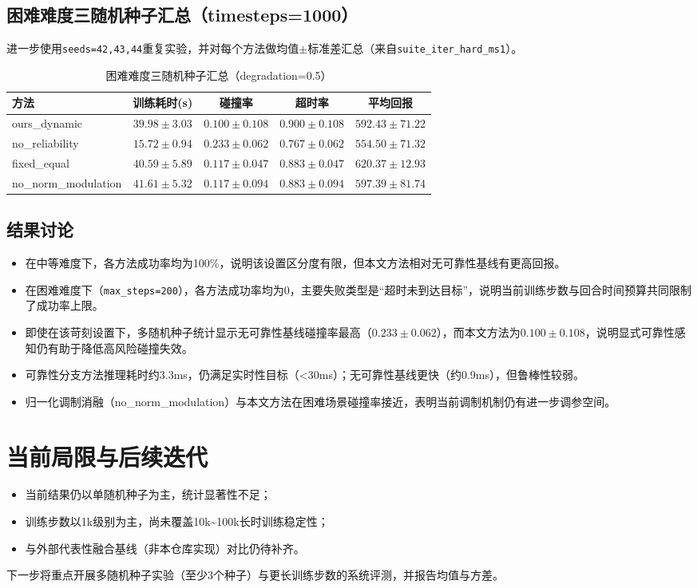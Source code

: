 \subsection{困难难度三随机种子汇总（timesteps=1000）}
进一步使用\texttt{seeds=42,43,44}重复实验，并对每个方法做均值$\pm$标准差汇总（来自\texttt{suite\_iter\_hard\_ms1}）。

\begin{table}[h!]
    \centering
    \caption{困难难度三随机种子汇总（degradation=0.5）}
    \label{tab-main-results-hard-multiseed}
    \begin{tabular}{lcccc}
        \toprule
        方法 & 训练耗时(s) & 碰撞率 & 超时率 & 平均回报 \\
        \midrule
        ours\_dynamic & $39.98 \pm 3.03$ & $0.100 \pm 0.108$ & $0.900 \pm 0.108$ & $592.43 \pm 71.22$ \\
        no\_reliability & $15.72 \pm 0.94$ & $0.233 \pm 0.062$ & $0.767 \pm 0.062$ & $554.50 \pm 71.32$ \\
        fixed\_equal & $40.59 \pm 5.89$ & $0.117 \pm 0.047$ & $0.883 \pm 0.047$ & $620.37 \pm 12.93$ \\
        no\_norm\_modulation & $41.61 \pm 5.32$ & $0.117 \pm 0.094$ & $0.883 \pm 0.094$ & $597.39 \pm 81.74$ \\
        \bottomrule
    \end{tabular}
\end{table}

\subsection{结果讨论}
\begin{itemize}
    \item 在中等难度下，各方法成功率均为100\%，说明该设置区分度有限，但本文方法相对无可靠性基线有更高回报。
    \item 在困难难度下（\texttt{max\_steps=200}），各方法成功率均为0，主要失败类型是“超时未到达目标”，说明当前训练步数与回合时间预算共同限制了成功率上限。
    \item 即使在该苛刻设置下，多随机种子统计显示无可靠性基线碰撞率最高（$0.233\pm0.062$），而本文方法为$0.100\pm0.108$，说明显式可靠性感知仍有助于降低高风险碰撞失效。
    \item 可靠性分支方法推理耗时约3.3ms，仍满足实时性目标（<30ms）；无可靠性基线更快（约0.9ms），但鲁棒性较弱。
    \item 归一化调制消融（no\_norm\_modulation）与本文方法在困难场景碰撞率接近，表明当前调制机制仍有进一步调参空间。
\end{itemize}

\section{当前局限与后续迭代}
\begin{itemize}
    \item 当前结果仍以单随机种子为主，统计显著性不足；
    \item 训练步数以1k级别为主，尚未覆盖10k\textasciitilde100k长时训练稳定性；
    \item 与外部代表性融合基线（非本仓库实现）对比仍待补齐。
\end{itemize}
下一步将重点开展多随机种子实验（至少3个种子）与更长训练步数的系统评测，并报告均值与方差。
